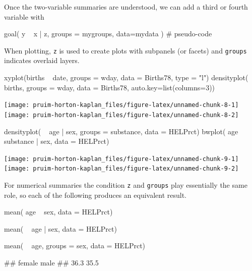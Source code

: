Once the two-variable summaries are understood, we can add a third or
fourth variable with

\begin{Schunk}
\begin{Sinput}
goal( y ~ x | z, groups = mygroups, data=mydata )    # pseudo-code
\end{Sinput}
\end{Schunk}

\noindent
When plotting, \texttt{z} is used to create plots with subpanels (or
facets) and \texttt{groups} indicates overlaid layers.

\begin{Schunk}
\begin{Sinput}
xyplot(births ~ date, groups = wday, data = Births78, type = "l")
densityplot( ~ births, groups = wday, data = Births78, auto.key=list(columns=3))
\end{Sinput}


\begin{center}\texttt{[image: pruim-horton-kaplan\_files/figure-latex/unnamed-chunk-8-1]} \texttt{[image: pruim-horton-kaplan\_files/figure-latex/unnamed-chunk-8-2]} \end{center}

\end{Schunk}\begin{Schunk}
\begin{Sinput}
densityplot( ~ age | sex, groups = substance, data = HELPrct)
bwplot( age ~ substance | sex, data = HELPrct)
\end{Sinput}


\begin{center}\texttt{[image: pruim-horton-kaplan\_files/figure-latex/unnamed-chunk-9-1]} \texttt{[image: pruim-horton-kaplan\_files/figure-latex/unnamed-chunk-9-2]} \end{center}

\end{Schunk}

For numerical summaries the condition \texttt{z} and \texttt{groups}
play essentially the same role, so each of the following produces an
equivalent result.

\begin{Schunk}
\begin{Sinput}
mean( age ~ sex, data = HELPrct)
\end{Sinput}
\end{Schunk}\begin{Schunk}
\begin{Sinput}
mean( ~ age | sex, data = HELPrct)
\end{Sinput}
\end{Schunk}\begin{Schunk}
\begin{Sinput}
mean( ~ age, groups = sex, data = HELPrct)
\end{Sinput}
\begin{Soutput}
## female   male 
##   36.3   35.5
\end{Soutput}
\end{Schunk}

